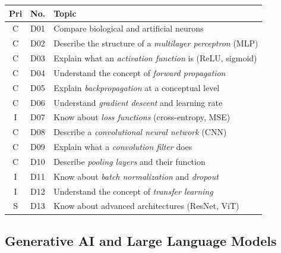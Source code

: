 \documentclass[11pt,a4paper]{article}
\begin{document}
\begin{longtable}{@{}clp{9cm}@{}}
\toprule
\textbf{Pri} & \textbf{No.} & \textbf{Topic} \\
\midrule
\endfirsthead
\midrule
\endhead
\midrule
\endfoot
\bottomrule
\endlastfoot
C & D01 & Compare biological and artificial neurons \\
C & D02 & Describe the structure of a \emph{multilayer perceptron} (MLP) \\
C & D03 & Explain what an \emph{activation function} is (ReLU, sigmoid) \\
C & D04 & Understand the concept of \emph{forward propagation} \\
C & D05 & Explain \emph{backpropagation} at a conceptual level \\
C & D06 & Understand \emph{gradient descent} and learning rate \\
I & D07 & Know about \emph{loss functions} (cross-entropy, MSE) \\
C & D08 & Describe a \emph{convolutional neural network} (CNN) \\
C & D09 & Explain what a \emph{convolution filter} does \\
C & D10 & Describe \emph{pooling layers} and their function \\
I & D11 & Know about \emph{batch normalization} and \emph{dropout} \\
I & D12 & Understand the concept of \emph{transfer learning} \\
S & D13 & Know about advanced architectures (ResNet, ViT) \\
\end{longtable}

\subsection{Generative AI and Large Language Models}
\end{document}
